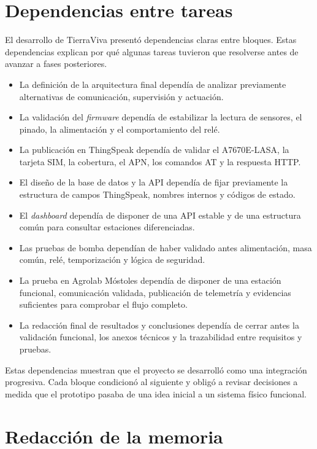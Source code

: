 \normalsize

\section{Dependencias entre tareas}

El desarrollo de TierraViva presentó dependencias claras entre bloques. Estas dependencias explican por qué algunas tareas tuvieron que resolverse antes de avanzar a fases posteriores.

\begin{itemize}
    \item La definición de la arquitectura final dependía de analizar previamente alternativas de comunicación, supervisión y actuación.
    \item La validación del \textit{firmware} dependía de estabilizar la lectura de sensores, el pinado, la alimentación y el comportamiento del relé.
    \item La publicación en ThingSpeak dependía de validar el A7670E-LASA, la tarjeta SIM, la cobertura, el APN, los comandos AT y la respuesta HTTP.
    \item El diseño de la base de datos y la API dependía de fijar previamente la estructura de campos ThingSpeak, nombres internos y códigos de estado.
    \item El \textit{dashboard} dependía de disponer de una API estable y de una estructura común para consultar estaciones diferenciadas.
    \item Las pruebas de bomba dependían de haber validado antes alimentación, masa común, relé, temporización y lógica de seguridad.
    \item La prueba en Agrolab Móstoles dependía de disponer de una estación funcional, comunicación validada, publicación de telemetría y evidencias suficientes para comprobar el flujo completo.
    \item La redacción final de resultados y conclusiones dependía de cerrar antes la validación funcional, los anexos técnicos y la trazabilidad entre requisitos y pruebas.
\end{itemize}

Estas dependencias muestran que el proyecto se desarrolló como una integración progresiva. Cada bloque condicionó al siguiente y obligó a revisar decisiones a medida que el prototipo pasaba de una idea inicial a un sistema físico funcional.

\section{Redacción de la memoria}

